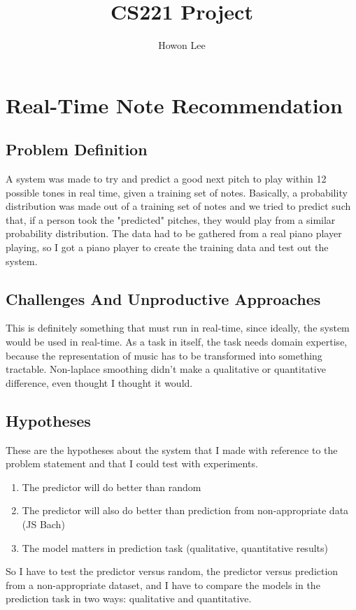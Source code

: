 \documentclass{article}
\begin{document}
\title{CS221 Project}
\author{Howon Lee}
\maketitle
\section*{Real-Time Note Recommendation}

\subsection*{Problem Definition}
A system was made to try and predict a good next pitch to play within 12 possible tones in real time, given a training set of notes. Basically, a probability distribution was made out of a training set of notes and we tried to predict such that, if a person took the "predicted" pitches, they would play from a similar probability distribution.
The data had to be gathered from a real piano player playing, so I got a piano player to create the training data and test out the system.


\subsection*{Challenges And Unproductive Approaches}
This is definitely something that must run in real-time, since ideally, the system would be used in real-time.
As a task in itself, the task needs domain expertise, because the representation of music has to be transformed into something tractable.
Non-laplace smoothing didn't make a qualitative or quantitative difference, even thought I thought it would.

\subsection*{Hypotheses}
These are the hypotheses about the system that I made with reference to the problem statement and that I could test with experiments.
\begin{enumerate}
    \item The predictor will do better than random
    \item The predictor will also do better than prediction from non-appropriate data (JS Bach)
    \item The model matters in prediction task (qualitative, quantitative results)
\end{enumerate}
So I have to test the predictor versus random, the predictor versus prediction from a non-appropriate dataset, and I have to compare the models in the prediction task in two ways: qualitative and quantitative.
\end{document}
